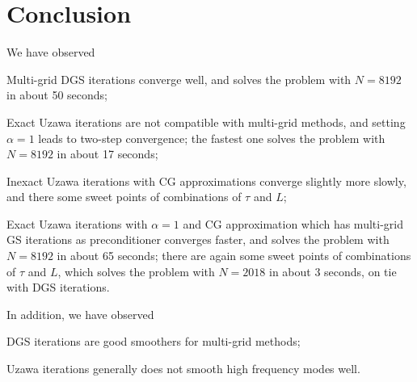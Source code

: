 \documentclass[english, nochinese]{pnote}
\begin{document}
\section{Conclusion}

We have observed
\begin{partlist}
\item Multi-grid DGS iterations converge well, and solves the problem with $ N = 8192 $ in about 50 seconds;
\item Exact Uzawa iterations are not compatible with multi-grid methods, and setting $ \alpha = 1 $ leads to two-step convergence; the fastest one solves the problem with $ N = 8192 $ in about 17 seconds;
\item Inexact Uzawa iterations with CG approximations converge slightly more slowly, and there some sweet points of combinations of $\tau$ and $L$;
\item Exact Uzawa iterations with $ \alpha = 1 $ and CG approximation which has multi-grid GS iterations as preconditioner converges faster, and solves the problem with $ N = 8192 $ in about 65 seconds; there are again some sweet points of combinations of $\tau$ and $L$, which solves the problem with $ N = 2018 $ in about $3$ seconds, on tie with DGS iterations.
\end{partlist}
In addition, we have observed
\begin{partlist}
\item DGS iterations are good smoothers for multi-grid methods;
\item Uzawa iterations generally does not smooth high frequency modes well.
\end{partlist}
\end{document}
